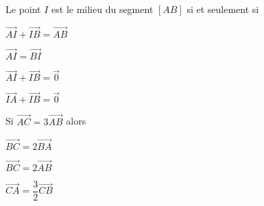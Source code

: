 \begin{QCM}
\begin{GroupeQCM}
\begin{exercice}Le point $I$ est le milieu du segment $[AB]$ si et seulement si
\begin{ChoixQCM}{4}
\item $\overrightarrow{AI}+\overrightarrow{IB}=\overrightarrow{AB}$
\item $\overrightarrow{AI}=\overrightarrow{BI}$
\item $\overrightarrow{AI}+\overrightarrow{IB}=\overrightarrow{0}$
\item $\overrightarrow{IA}+\overrightarrow{IB}=\overrightarrow{0}$
\end{ChoixQCM}
\begin{corrige}
\end{corrige}
\end{exercice}

\begin{exercice}Si $\overrightarrow{AC}=3\overrightarrow{AB}$ alors 
\begin{ChoixQCM}{3}
\item $\overrightarrow{BC}=2\overrightarrow{BA}$
\item $\overrightarrow{BC}=2\overrightarrow{AB}$
\item $\overrightarrow{CA}=\dfrac{3}{2}\overrightarrow{CB}$
\end{ChoixQCM}
\begin{corrige}
\end{corrige}
\end{exercice}



\end{GroupeQCM}
\end{QCM}

  
